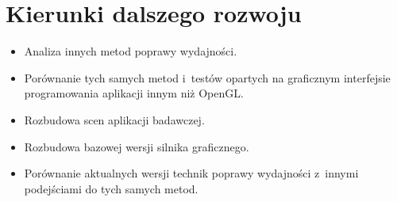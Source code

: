 \documentclass[a4paper,twoside,12pt]{book}
\newcounter{stronyPozaNumeracja}
\begin{document}
\section{Kierunki dalszego rozwoju}
\begin{itemize}
    \item Analiza innych metod poprawy wydajności.
    \item Porównanie tych samych metod i~testów opartych na graficznym interfejsie programowania aplikacji innym niż OpenGL.
    \item Rozbudowa scen aplikacji badawczej.
    \item Rozbudowa bazowej wersji silnika graficznego.
    \item Porównanie aktualnych wersji technik poprawy wydajności z~innymi podejściami do tych samych metod.
\end{itemize}



\backmatter
{}
\setcounter{page}{\value{stronyPozaNumeracja}}

\pagestyle{tylkoNumeryStron}





\end{document}
